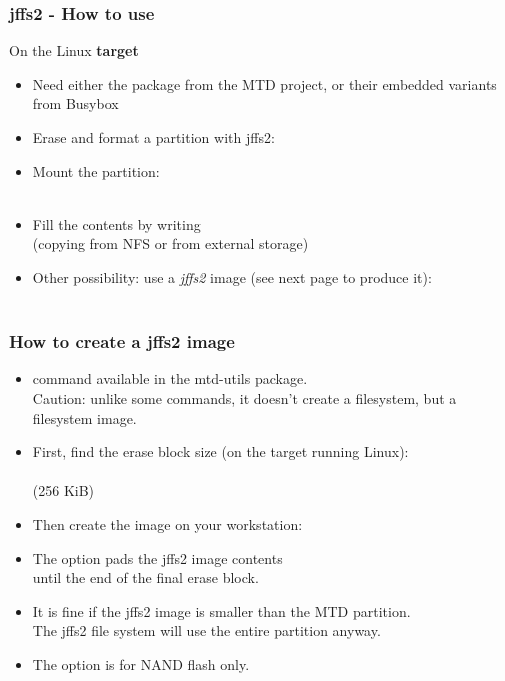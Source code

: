 \begin{frame}
  \frametitle{jffs2 - How to use}
  On the Linux {\bf target}
  \begin{itemize}
  \item Need either the  package from the MTD project,
    or their embedded variants from Busybox
  \item Erase and format a partition with jffs2:\\
  \item Mount the partition:\\
    \\
  \item Fill the contents by writing\\
    (copying from NFS or from external storage)
  \item Other possibility: use a {\em jffs2} image (see next page to
    produce it):\\
    \\
  \end{itemize}
\end{frame}

\begin{frame}
  \frametitle{How to create a jffs2 image}
  \begin{itemize}
  \item {} command available in the mtd-utils package.\\
    Caution: unlike some  commands, it doesn't create a
    filesystem, but a filesystem image.
  \item First, find the erase block size (on the target running Linux):\\
     \\
     (256 KiB)
  \item Then create the image on your workstation:\\
  \item The  option pads the jffs2 image contents\\
    until the end of the final erase block.
  \item It is fine if the jffs2 image is smaller than the MTD partition.\\
    The jffs2 file system will use the entire partition anyway.
  \item The  option is for NAND flash only.
  \end{itemize}
\end{frame}

